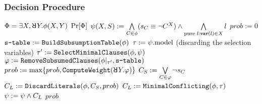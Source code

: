\begin{frame}
    \frametitle{Decision Procedure}
    {\scriptsize
        \begin{algorithmic}[1]
            \REQUIRE $\Qf=\exists X,\random{} Y.\pf(X,Y)$
            \ENSURE $\Pr[\Phi]$
            \STATE $\psi(X,S) := \bigwedge\limits_{C\in\phi}(s_{C}\equiv\lnot C^X)\land\bigwedge\limits_{\text{pure }l: \texttt{var}(l)\in X}l$\label{code:erssat-init-select}
            \STATE $prob := 0$
            \STATE $\texttt{s-table} := \texttt{BuildSubsumptionTable}(\phi)$\label{code:erssat-subsume-table}
            \WHILE{($\sat{\select}$)}
            \STATE $\tau := \psi.\mathrm{model}$ (discarding the selection variables)
            \IF{($\sat{\pcf{\pf}{\as}}$)}
            \STATE $\tau' := \texttt{SelectMinimalClauses}(\phi,\psi)$\label{code:erssat-minimal-clauses}
            \STATE $\varphi := \texttt{RemoveSubsumedClauses}(\phi|_{\tau'},\texttt{s-table})$\label{code:erssat-subsume-clauses}
            \STATE $prob := \max\{prob,\texttt{ComputeWeight}(\random{} Y.\varphi)\}$\label{code:erssat-wmc}
            \STATE $C_S := \bigvee\limits_{C\in\varphi}\lnot s_{C}$
            \STATE $C_L := \texttt{DiscardLiterals}(\phi,C_S,prob)$\label{code:erssat-discard-literals}
            \ELSE
            \STATE $C_L := \texttt{MinimalConflicting}(\phi,\tau)$
            \ENDIF
            \STATE $\psi := \psi \land C_L$
            \ENDWHILE
            \RETURN $prob$
        \end{algorithmic}
    }
\end{frame}